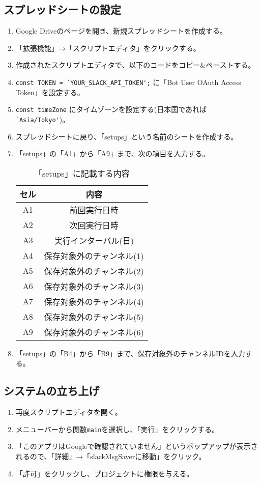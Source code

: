 \documentclass[a4j, 11pt]{jsarticle}
\begin{document}
\subsection{スプレッドシートの設定}
\begin{enumerate}
\item Google Driveのページを開き、新規スプレッドシートを作成する。
\item 「拡張機能」→「スクリプトエディタ」をクリックする。
\item 作成されたスクリプトエディタで、以下のコードをコピー\&ペーストする。
\item \verb|const TOKEN = `YOUR_SLACK_API_TOKEN';| に「Bot User OAuth Access Token」を設定する。
\item \verb|const timeZone| にタイムゾーンを設定する(日本国であれば\verb|`Asia/Tokyo'|)。
\item スプレッドシートに戻り、「setups」という名前のシートを作成する。
\item 「setups」の「A1」から「A9」まで、次の項目を入力する。

\begin{table}[htp]
\caption{「setups」に記載する内容}
\begin{center}
\begin{tabular}{|c|c|}
\hline
セル & 内容\\
\hline
A1 & 前回実行日時\\
A2 & 次回実行日時\\
A3 & 実行インターバル(日)\\
A4 & 保存対象外のチャンネル(1)\\
A5 & 保存対象外のチャンネル(2)\\
A6 & 保存対象外のチャンネル(3)\\
A7 & 保存対象外のチャンネル(4)\\
A8 & 保存対象外のチャンネル(5)\\
A9 & 保存対象外のチャンネル(6)\\
\hline
\end{tabular}
\end{center}
\end{table}%

\item 「setups」の「B4」から「B9」まで、保存対象外のチャンネルIDを入力する。
\end{enumerate}

\subsection{システムの立ち上げ}
\begin{enumerate}
\item 再度スクリプトエディタを開く。
\item メニューバーから関数\verb|main|を選択し、「実行」をクリックする。
\item 「このアプリはGoogleで確認されていません」というポップアップが表示されるので、「詳細」→「slackMsgSaverに移動」をクリック。
\item 「許可」をクリックし、プロジェクトに権限を与える。
\end{enumerate}
\end{document}
